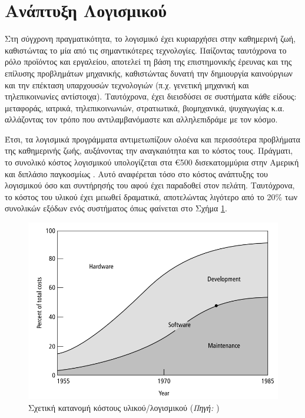\documentclass{report}
\begin{document}
\newpage
\section{Ανάπτυξη Λογισμικού}

Στη σύγχρονη πραγματικότητα, το λογισμικό έχει κυριαρχήσει στην καθημερινή ζωή, καθιστώντας το μία από τις σημαντικότερες τεχνολογίες. Παίζοντας ταυτόχρονα το ρόλο προϊόντος και εργαλείου, αποτελεί τη βάση της επιστημονικής έρευνας και της επίλυσης προβλημάτων μηχανικής, καθιστώντας δυνατή την δημιουργία καινούργιων και την επέκταση υπαρχουσών τεχνολογιών (π.χ. γενετική μηχανική και τηλεπικοινωνίες αντίστοιχα). Ταυτόχρονα, έχει διεισδύσει σε συστήματα κάθε είδους: μεταφοράς, ιατρικά, τηλεπικοινωνιών, στρατιωτικά, βιομηχανικά, ψυχαγωγίας κ.α. αλλάζοντας τον τρόπο που αντιλαμβανόμαστε και αλληλεπιδράμε με τον κόσμο.

Έτσι, τα λογισμικά προγράμματα αντιμετωπίζουν ολοένα και περισσότερα προβλήματα της καθημερινής ζωής, αυξάνοντας την αναγκαιότητα και το κόστος τους. Πράγματι, το συνολικό κόστος λογισμικού υπολογίζεται στα \euro500 δισεκατομμύρια στην Αμερική και διπλάσιο παγκοσμίως \cite{software_engineering_principles}. Αυτό αναφέρεται τόσο στο κόστος ανάπτυξης του λογισμικού όσο και συντήρησής του αφού έχει παραδοθεί στον πελάτη. Ταυτόχρονα, το κόστος του υλικού έχει μειωθεί δραματικά, αποτελώντας λιγότερο από το 20\% των συνολικών εξόδων ενός συστήματος όπως φαίνεται στο Σχήμα \ref{fig:hardware_software_costs}.

\begin{figure}[h]
    \centering
    \includegraphics[scale=2.2]{images/software_engineering/hardware_software_costs.png}
    \caption{Σχετική κατανομή κόστους υλικού/λογισμικού (\textsl{Πηγή: \cite{hardware_software_costs}}) }
    \label{fig:hardware_software_costs}
\end{figure}
\end{document}
